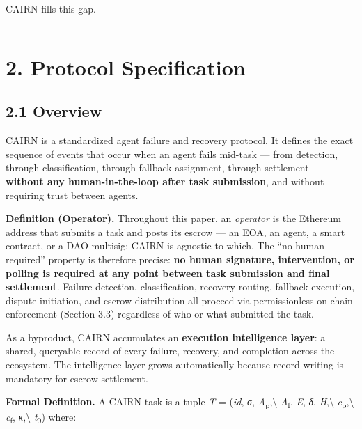 \documentclass[
  10pt,
]{article}
\begin{document}
CAIRN fills this gap.

\begin{center}\rule{0.5\linewidth}{0.5pt}\end{center}

\hypertarget{protocol-specification}{%
\section{2. Protocol Specification}\label{protocol-specification}}

\hypertarget{overview}{%
\subsection{2.1 Overview}\label{overview}}

CAIRN is a standardized agent failure and recovery protocol. It defines
the exact sequence of events that occur when an agent fails mid-task ---
from detection, through classification, through fallback assignment,
through settlement --- \textbf{without any human-in-the-loop after task
submission}, and without requiring trust between agents.

\textbf{Definition (Operator).} Throughout this paper, an
\emph{operator} is the Ethereum address that submits a task and posts
its escrow --- an EOA, an agent, a smart contract, or a DAO multisig;
CAIRN is agnostic to which. The ``no human required'' property is
therefore precise: \textbf{no human signature, intervention, or polling
is required at any point between task submission and final settlement}.
Failure detection, classification, recovery routing, fallback execution,
dispute initiation, and escrow distribution all proceed via
permissionless on-chain enforcement (Section 3.3) regardless of who or
what submitted the task.

As a byproduct, CAIRN accumulates an \textbf{execution intelligence
layer}: a shared, queryable record of every failure, recovery, and
completion across the ecosystem. The intelligence layer grows
automatically because record-writing is mandatory for escrow settlement.

\textbf{Formal Definition.} A CAIRN task is a tuple \emph{T} =
(\emph{id}, \emph{σ}, \emph{A}\textsubscript{p},\textbackslash{}
\emph{A}\textsubscript{f}, \emph{E}, \emph{δ}, \emph{H},\textbackslash{}
\emph{c}\textsubscript{p},\textbackslash{} \emph{c}\textsubscript{f},
\emph{κ},\textbackslash{} \emph{t}\textsubscript{0}) where:
\end{document}
